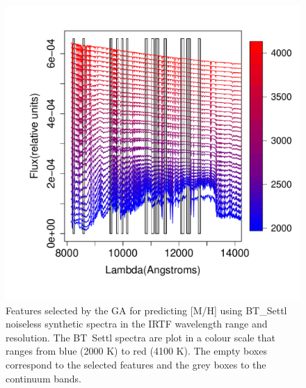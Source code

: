 \begin {figure}
 \centering
  \includegraphics[scale=0.55]{figs/BT-spectraAtIRTF-Inf-mh}
  \caption{Features selected by the GA for predicting [M/H] using
    BT\_Settl noiseless synthetic spectra in the IRTF wavelength range
    and resolution. The BT\ Settl spectra are plot in a colour scale
    that ranges from blue (2000 K) to red (4100 K). The empty boxes
    correspond to the selected features and the grey boxes to the
    continuum bands.}
\label{fig:irtf-met-inf}
\end {figure}


